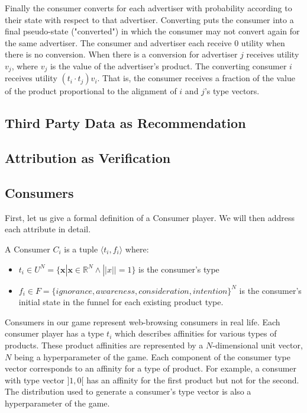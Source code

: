 \documentclass{article}
\begin{document}
Finally the consumer converts for each advertiser with probability according to their state with respect to that advertiser. Converting puts the consumer into a final pseudo-state ("converted") in which the consumer may not convert again for the same advertiser. The consumer and advertiser each receive 0 utility when there is no conversion. When there is a conversion for advertiser $j$ receives utility $v_j$, where $v_j$ is the value of the advertiser's product. The converting consumer $i$ receives utility $(t_i \cdot t_j) v_i$. That is, the consumer receives a fraction of the value of the product proportional to the alignment of $i$ and $j$'s type vectors.



\subsection{Third Party Data as Recommendation}

\subsection{Attribution as Verification}

\subsection{Consumers}

First, let us give a formal definition of a Consumer player. We will then address each attribute in detail.

A Consumer $C_i$ is a tuple $\langle t_i, f_i \rangle$ where:

\begin{itemize}
	\item $t_i \in U^N = \{\bm{x} | \bm{x} \in \mathbb{R}^N \wedge ||x|| = 1\}$ is the consumer's type
	\item $f_i \in F = \{ignorance, awareness, consideration, intention\}^N$ is the consumer's initial state in the funnel for each existing product type. 
\end{itemize}

Consumers in our game represent web-browsing consumers in real life. Each consumer player has a type $t_i$ which describes affinities for various types of products. These product affinities are represented by a $N$-dimensional unit vector, $N$ being a hyperparameter of the game. Each component of the consumer type vector corresponds to an affinity for a type of product. For example, a consumer with type vector $\rbrack 1, 0 \lbrack$ has an affinity for the first product but not for the second. The distribution used to generate a consumer's type vector is also a hyperparameter of the game.
\end{document}
